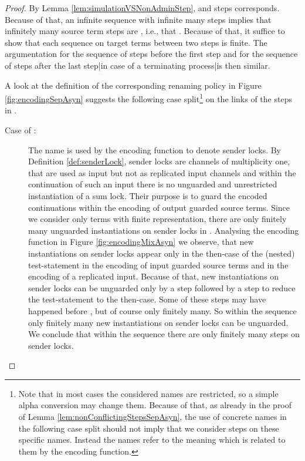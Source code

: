 \documentclass[]{llncs}
\begin{document}
\begin{proof}
	By Lemma \ref{lem:simulationVSNonAdminStep}, \simulations and \nonAdmin steps corresponds. Because of that, an infinite sequence  with infinite many \nonAdmin steps implies that infinitely many source term steps are \simulated, i.e., that . Because of that, it suffice to show that each sequence  on target terms  between two \nonAdmin steps is finite. The argumentation for the sequence of \admin steps  before the first \nonAdmin step and for the sequence of \admin steps after the last \nonAdmin step|in case of a terminating process|is then similar.
	
	A look at the definition of the corresponding renaming policy in Figure \ref{fig:encodingSepAsyn} suggests the following case split\footnote{Note that in most cases the considered names are restricted, so a simple alpha conversion may change them. Because of that, as already in the proof of Lemma \ref{lem:nonConflictingStepsSepAsyn}, the use of concrete names in the following case split should not imply that we consider steps on these specific names. Instead the names refer to the meaning which is related to them by the encoding function.} on the links of the steps in .
	\begin{description}
		\item[Case of :] The name  is used by the encoding function to denote sender locks. By Definition \ref{def:senderLock}, sender locks are channels of multiplicity one, that are used as input but not as replicated input channels and within the continuation of such an input there is no unguarded and unrestricted instantiation of a sum lock. Their purpose is to guard the encoded continuations within the encoding of output guarded source terms. Since we consider only terms with finite representation, there are only finitely many unguarded instantiations on sender locks in . Analysing the encoding function in Figure \ref{fig:encodingMixAsyn} we observe, that new instantiations on sender locks appear only in the then-case of the (nested) test-statement in the encoding of input guarded source terms and in the encoding of a replicated input. Because of that, new instantiations on sender locks can be unguarded only by a \nonAdmin step followed by a \pure \admin step to reduce the test-statement to the then-case. Some of these \nonAdmin steps may have happened before , but of course only finitely many. So within the sequence  only finitely many new instantiations on sender locks can be unguarded. We conclude that within the sequence  there are only finitely many steps on sender locks.
			

\end{description}
\end{proof}
\end{document}
